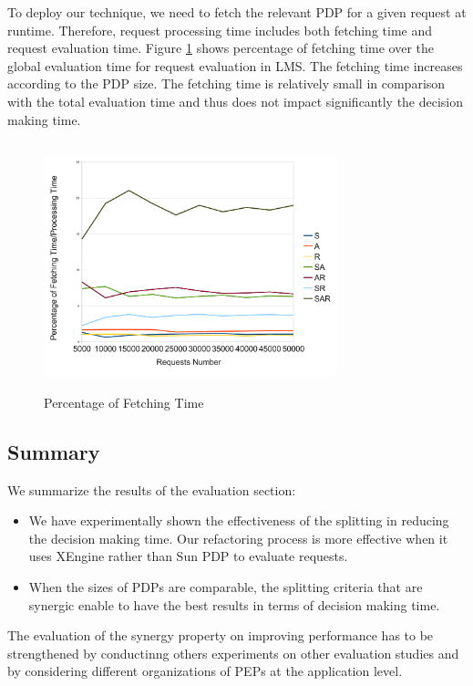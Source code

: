 To deploy our technique, we need to fetch the relevant PDP for a given request at runtime. Therefore, request processing time includes both fetching time and request evaluation time.
Figure \ref{Fetching Time} shows percentage of fetching time over the global evaluation time for request evaluation in LMS. 
The fetching time increases according to the PDP size. The fetching time is relatively small in comparison with the total evaluation time and thus 
does not impact significantly the decision making time.
\begin{figure}[!h]
  \centering
\includegraphics[width=8.5cm, height=7.2cm]{fetching.pdf}
\begin{center}
\caption{Percentage of Fetching Time}
\label{Fetching Time}
\end{center}
\end{figure}
\subsection{Summary}
We summarize the results of the evaluation section:
\begin{itemize}
 \item We have experimentally shown the effectiveness of the splitting in reducing the decision making time. Our refactoring process is more effective when 
it uses XEngine rather than Sun PDP to evaluate requests.
 \item When the sizes of PDPs are comparable, the splitting criteria that are synergic enable to have the best results in terms of 
decision making time.
\end{itemize}
The evaluation of the synergy property on improving performance has to be strengthened by conductinng others experiments 
on other evaluation studies and by considering different organizations of PEPs at the application level.

